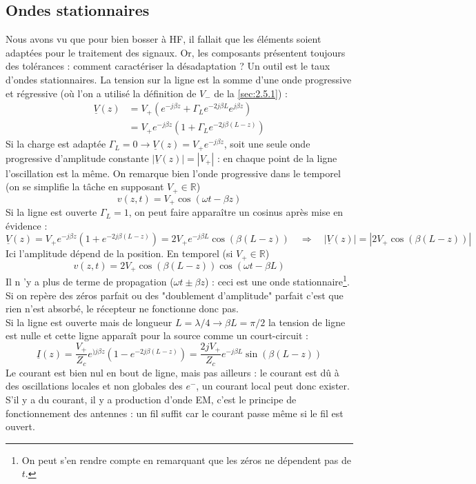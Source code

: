 	\subsection{Ondes stationnaires}
	Nous avons vu que pour bien bosser à HF, il fallait que les éléments soient adaptées pour le 
	traitement des signaux. Or, les composants présentent toujours des tolérances : comment 
	caractériser la désadaptation ? Un outil est le taux d'ondes stationnaires. La tension sur 
	la ligne est la somme d'une onde progressive et régressive (où l'on a utilisé la définition 
	de $V_-$ de la \autoref{sec:2.5.1}) :
	\begin{equation}
	\begin{array}{ll}
	\underline{V}(z) &= V_+(e^{-j\beta z} + \Gamma_L e^{-2j\beta L}e^{j\beta z})\\
	&= V_+e^{-j\beta z}(1+\Gamma_Le^{-2j\beta(L-z)})
	\end{array}
	\end{equation}
	Si la charge est adaptée $\Gamma_L = 0 \rightarrow \underline{V}(z) = V_+e^{-j\beta z}$, 
	soit une seule onde progressive d'amplitude constante $|\underline{V}(z)|=|V_+|$ : en 
	chaque point de la ligne l'oscillation est la même. On remarque bien l'onde progressive 
	dans le temporel (on se simplifie la tâche en supposant $V_+\in\mathbb{R}$)
	\begin{equation}
	v(z,t) = V_+\cos(\omega t-\beta z)
	\end{equation}
	Si la ligne est ouverte $\Gamma_L=1$, on peut faire apparaître un cosinus après mise 
	en évidence :
	\begin{equation}
	\underline{V}(z) = V_+e^{-j\beta z}(1+e^{-2j\beta(L-z)}) = 2V_+e^{-j\beta L}\cos(
	\beta(L-z))\quad\Rightarrow\quad |\underline{V}(z)| = |2V_+\cos(\beta(L-z))|
	\end{equation}
	Ici l'amplitude dépend de la position. En temporel (si $V_+\in\mathbb{R}$)
	\begin{equation}
	v(z,t) = 2V_+\cos(\beta(L-z))\cos(\omega t-\beta L)
	\end{equation}
	Il n 'y a plus de terme de propagation ($\omega t \pm \beta z$) : ceci est une onde 
	stationnaire\footnote{On peut s'en rendre compte en remarquant que les zéros ne 
	dépendent pas de $t$.}. Si on repère des zéros parfait ou des "doublement d'amplitude" 
	parfait c'est que rien n'est absorbé, le récepteur ne fonctionne donc pas.\\
	
	\danger Si la ligne est ouverte mais de longueur $L=\lambda/4 \rightarrow \beta L = 
	\pi/2$ la tension de ligne est nulle et cette ligne apparaît pour la source comme un 
	court-circuit :
	\begin{equation}
	\underline{I}(z) = \dfrac{V_+}{Z_c}e^{)j\beta z}(1-e^{-2j\beta(L-z)}) = \dfrac{2jV_+}{
	Z_c}e^{-j\beta L}\sin(\beta(L-z))
	\end{equation}
	Le courant est bien nul en bout de ligne, mais pas ailleurs : le courant est dû à 
	des oscillations locales et non globales des $e^-$, un courant local peut donc exister. 
	S'il y a du courant, il y a production d'onde EM, c'est le principe de fonctionnement 
	des antennes : un fil suffit car le courant passe même si le fil est ouvert.\\
	
